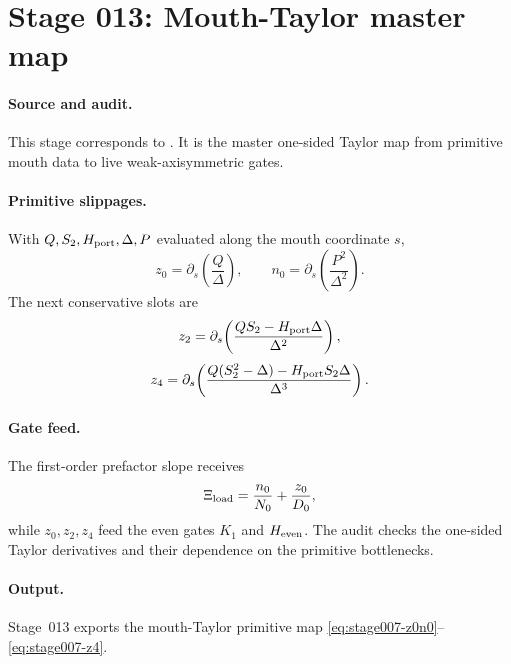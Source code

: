 \section[Stage 013]{Stage 013: Mouth-Taylor master map}
\label{stage:013}


\paragraph{Source and audit.}
This stage corresponds to
.
It is the master one-sided Taylor map from primitive mouth data to live
weak-axisymmetric gates.

\paragraph{Primitive slippages.}
With \(Q,S_2,H_{\rm port},\Delta,P\) evaluated along the mouth coordinate \(s\),
\begin{equation}
\label{eq:stage007-z0n0}
z_0=\partial_s\!\left(\frac{Q}{\Delta}\right),
\qquad
n_0=\partial_s\!\left(\frac{P^2}{\Delta^2}\right).
\end{equation}
The next conservative slots are
\begin{equation}
\label{eq:stage007-z2}
z_2=\partial_s\!\left(\frac{QS_2-H_{\rm port}\Delta}{\Delta^2}\right),
\end{equation}
\begin{equation}
\label{eq:stage007-z4}
z_4=\partial_s\!\left(
\frac{Q(S_2^2-\Delta)-H_{\rm port}S_2\Delta}{\Delta^3}
\right).
\end{equation}

\paragraph{Gate feed.}
The first-order prefactor slope receives
\begin{equation}
\label{eq:stage013-xi}
\Xi_{\rm load}=\frac{n_0}{N_0}+\frac{z_0}{D_0},
\end{equation}
while \(z_0,z_2,z_4\) feed the even gates \(K_1\) and \(H_{\rm even}\).  The
audit checks the one-sided Taylor derivatives and their dependence on the
primitive bottlenecks.

\paragraph{Output.}
Stage~013 exports the mouth-Taylor primitive map
\eqref{eq:stage007-z0n0}--\eqref{eq:stage007-z4}.
